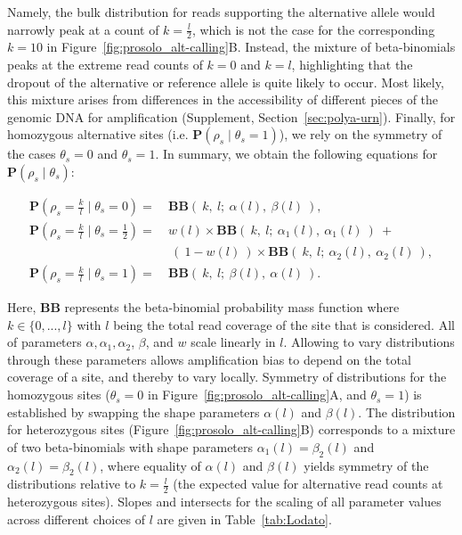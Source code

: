 \documentclass[12pt,inline]{wlscirep}
\newcommand{\Prob}{{\mathbf{P}}}
\newcommand{\cB}{{\mathbf{B}}}
\begin{document}
Namely, the bulk distribution for reads supporting the alternative allele would narrowly peak at a count of $k=\frac{l}{2}$, which is not the case for the corresponding $k=10$ in Figure~\ref{fig:prosolo_alt-calling}B.
Instead, the mixture of beta-binomials peaks at the extreme read counts of $k=0$ and $k=l$, highlighting that the dropout of the alternative or reference allele is quite likely to occur.
Most likely, this mixture arises from differences in the accessibility of different pieces of the genomic DNA for amplification\cite{picher_trueprime_2016} (Supplement, Section~\ref{sec:polya-urn}).
Finally, for homozygous alternative sites (i.e. $\mathbf{P}(\rho_s\mid\theta_s=1)$), we rely on the symmetry of the cases $\theta_s=0$ and $\theta_s=1$.
In summary, we obtain the following equations for $\mathbf{P}(\rho_s\mid\theta_s)$:

\begin{equation}
	\label{eq:BBLodato}
	\begin{split}
		\Prob(\rho_s = \frac{k}{l} \mid \theta_s = 0 ) 			=~ &\cB\cB(~ k,~ l;~ \alpha(l),~ \beta(l)~ ),\\
		\Prob(\rho_s = \frac{k}{l} \mid \theta_s = \frac12) =~ &w(l) \times \cB\cB(~ k,~ l;~ \alpha_1(l),~ \alpha_1(l)~ )~ +\\
                                                       ~&~(~ 1-w(l)~ ) \times \cB\cB(~ k,~ l;~ \alpha_2(l),~ \alpha_2(l)~ ),\\
		\Prob(\rho_s = \frac{k}{l} \mid \theta_s = 1 ) 			=~ &\cB\cB(~ k,~ l;~ \beta(l),~ \alpha(l)~ ).
	\end{split}
\end{equation}

Here, $\cB\cB$ represents the beta-binomial probability mass function where $k\in\{0,...,l\}$ with $l$ being the total read coverage of the site that is considered. All of parameters $\alpha, \alpha_1,\alpha_2$, $\beta$, and $w$ scale linearly in $l$.
Allowing to vary distributions through these parameters allows amplification bias to depend on the total coverage of a site, and thereby to vary locally.
Symmetry of distributions for the homozygous sites ($\theta_s = 0$ in Figure~\ref{fig:prosolo_alt-calling}A, and $\theta_s = 1$) is established by swapping the shape parameters $\alpha(l)$ and $\beta(l)$.
The distribution for heterozygous sites (Figure~\ref{fig:prosolo_alt-calling}B) corresponds to a mixture of two beta-binomials with shape parameters $\alpha_1(l)=\beta_2(l)$ and $\alpha_2(l)=\beta_2(l)$, where equality of $\alpha(l)$ and $\beta(l)$ yields symmetry of the distributions relative to $k = \frac{l}{2}$ (the expected value for alternative read counts at heterozygous sites).
Slopes and intersects for the scaling of all parameter values across different choices of $l$ are given in Table~\ref{tab:Lodato}.
\end{document}
